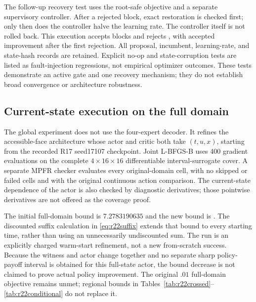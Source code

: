 The follow-up recovery test uses the root-safe objective and a separate supervisory controller. After a rejected block, exact restoration is checked first; only then does the controller halve the learning rate. The controller itself is not rolled back. This execution accepts \RXXIIRecoveryAccepted{} blocks and rejects \RXXIIRecoveryRejected{}, with accepted improvement after the first rejection. All proposal, incumbent, learning-rate, and state-hash records are retained. Explicit no-op and state-corruption tests are listed as fault-injection regressions, not empirical optimizer outcomes. These tests demonstrate an active gate and one recovery mechanism; they do not establish broad convergence or architecture robustness.

\subsection{Current-state execution on the full domain}\label{sec:r22state}
The global experiment does not use the four-expert decoder. It refines the accessible-face architecture whose actor and critic both take $(t,u,x)$, starting from the recorded R17 seed17107 checkpoint. Joint L-BFGS-B uses 400 gradient evaluations on the complete $4\times16\times16$ differentiable interval-surrogate cover. A separate MPFR checker evaluates every original-domain cell, with no skipped or failed cells and with the original continuous action comparison. The current-state dependence of the actor is also checked by diagnostic derivatives; those pointwise derivatives are not offered as the coverage proof.

The initial full-domain bound is $7.2783190635$ and the new bound is \RXXIIGlobalBound{}. The discounted suffix calculation in \eqref{eq:r22suffix} extends that bound to every starting time, rather than using an unnecessarily undiscounted sum. The run is an explicitly charged warm-start refinement, not a new from-scratch success. Because the witness and actor change together and no separate sharp policy-payoff interval is obtained for this full-state actor, the bound decrease is not claimed to prove actual policy improvement. The original $.01$ full-domain objective remains unmet; regional bounds in Tables~\ref{tab:r22crossed}--\ref{tab:r22conditional} do not replace it.

